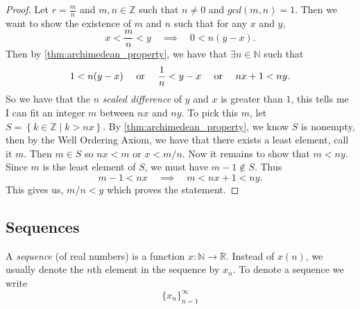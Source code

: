 \documentclass[../main.tex]{subfiles}
\begin{document}
    \begin{proof}
    Let \( r = \frac{m}{n}\) and \( m,n \in \mathbb{Z}\) such that \( n \neq 0\) and \( gcd(m,n) = 1\). Then we want to show the existence of \( m\) and \(n\) such that for any \(x\) and \(y\),
    \[
    x < \frac{m}{n} < y \quad \implies \quad 0 < n(y-x).
    \]
    Then by \ref{thm:archimedean_property}, we have that \( \exists n \in \mathbb{N}\) such that 
    \[
    1 < n(y-x) \quad \textnormal{ or } \quad \frac{1}{n} < y - x \quad \textnormal{ or } \quad nx + 1 < ny.
    \]
    So we have that the \(n\) \textit{scaled difference} of \(y\) and \(x\) is greater than \(1\), this tells me I can fit an integer \(m\) between \(nx\) and \(ny\). To pick this \(m\), let \( S = \left\{k \in \mathbb{Z} \mid k > nx \right\}\). By \ref{thm:archimedean_property}, we know \(S\) is nonempty, then by the Well Ordering Axiom, we have that there exists a least element, call it \(m\). Then \( m\in S\) so \( nx < m\) or \( x < m/n\). Now it remains to show that \( m < ny\). Since \(m\) is the least element of \(S\), we must have \( m-1 \notin S\). Thus \[
    m-1 < nx \quad \implies \quad m < nx + 1 < ny.
    \]
    This gives us, \( m/n < y\) which proves the statement.
     
    
    \end{proof}
    
    
    
    
    
    
    
    \subsection{Sequences}
    
    
    
    
    
    
    
    
    
    
    \begin{definition}[Sequence] \label{def:sequence}
    A \textit{sequence} (of real numbers) is a function \( x : \mathbb{N} \to \mathbb{R} \). Instead of \( x(n) \), we usually denote the \( n \)th element in the sequence by \(x_n\). To denote a sequence we write 
    \[
    \{x_n\}_{n=1}^{\infty}
    \]
    \end{definition}
    
    
    
    
    
    
    
    
    
\end{document}
